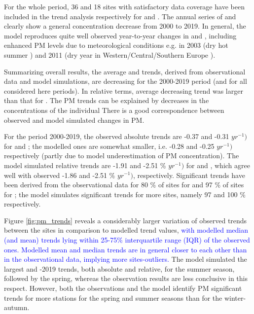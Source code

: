 For the whole period, 36 and 18 sites with satisfactory data coverage have been included in the trend analysis respectively for \PM[10] and \PM[2.5]. The annual series of \PM[10] and \PM[2.5] clearly show a general concentration decrease from 2000 to 2019. In general, the model reproduces quite well observed year-to-year changes in \PM[10] and \PM[2.5], including enhanced PM levels due to meteorological conditions e.g. in 2003 (dry hot summer \citep{EMEP:PM2005}) and 2011 (dry year in Western/Central/Southern Europe \citep{EMEP:PM2013}).

Summarizing overall results, the average \PM[10] and \PM[2.5] trends, derived from observational data and model simulations, are decreasing for the 2000-2019 period (and for all considered here periods). In relative terms, \PM[2.5] average decreasing trend was larger than that for \PM[10]. The PM trends can be explained by decreases in the concentrations of the individual There is a good correspondence between observed and model simulated changes in PM. %

For the period 2000-2019, the observed absolute trends are -0.37 and -0.31 \ug $yr^{-1})$ for \PM[10] and \PM[2.5]; the modelled ones are somewhat smaller, i.e. -0.28 and -0.25 \ug $yr^{-1})$ respectively (partly due to model underestimation of PM concentration). The model simulated relative trends are -1.91 and -2.51 \% $yr^{-1})$ for \PM[10] and \PM[2.5], which agree well with observed -1.86 and -2.51 \% $yr^{-1})$, respectively. Significant trends have been derived from the observational data for 80 \% of sites for \PM[10] and 97 \% of sites for \PM[2.5]; the model simulates significant trends for more sites, namely 97 and 100 \% respectively.  

Figure \ref{fig:pm_trends} reveals a considerably larger variation of observed trends between the sites in comparison to modelled trend values, \textcolor{blue}{with modelled median (and mean) trends lying within 25-75\% interquartile range (IQR) of the observed ones. Modelled mean and median trends are in general closer to each other than in the observational data, implying more sites-outliers.} The model simulated the largest \PM[10] and -2019 trends, both absolute and relative,  for the summer season, followed by the spring, whereas the observation results are less conclusive in this respect. However, both the observations and the model identify PM significant trends for more stations for the spring and summer seasons than for the winter-autumn. 

